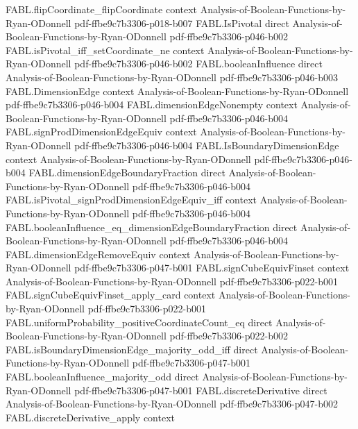 \begin{theorem}
\proofstep
  {FABL.flipCoordinate_flipCoordinate}
  {context}
  {Analysis-of-Boolean-Functions-by-Ryan-ODonnell}
  {pdf-ffbe9c7b3306-p018-b007}
\proofstep
  {FABL.IsPivotal}
  {direct}
  {Analysis-of-Boolean-Functions-by-Ryan-ODonnell}
  {pdf-ffbe9c7b3306-p046-b002}
\proofstep
  {FABL.isPivotal_iff_setCoordinate_ne}
  {context}
  {Analysis-of-Boolean-Functions-by-Ryan-ODonnell}
  {pdf-ffbe9c7b3306-p046-b002}
\proofstep
  {FABL.booleanInfluence}
  {direct}
  {Analysis-of-Boolean-Functions-by-Ryan-ODonnell}
  {pdf-ffbe9c7b3306-p046-b003}
\proofstep
  {FABL.DimensionEdge}
  {context}
  {Analysis-of-Boolean-Functions-by-Ryan-ODonnell}
  {pdf-ffbe9c7b3306-p046-b004}
\proofstep
  {FABL.dimensionEdgeNonempty}
  {context}
  {Analysis-of-Boolean-Functions-by-Ryan-ODonnell}
  {pdf-ffbe9c7b3306-p046-b004}
\proofstep
  {FABL.signProdDimensionEdgeEquiv}
  {context}
  {Analysis-of-Boolean-Functions-by-Ryan-ODonnell}
  {pdf-ffbe9c7b3306-p046-b004}
\proofstep
  {FABL.IsBoundaryDimensionEdge}
  {context}
  {Analysis-of-Boolean-Functions-by-Ryan-ODonnell}
  {pdf-ffbe9c7b3306-p046-b004}
\proofstep
  {FABL.dimensionEdgeBoundaryFraction}
  {direct}
  {Analysis-of-Boolean-Functions-by-Ryan-ODonnell}
  {pdf-ffbe9c7b3306-p046-b004}
\proofstep
  {FABL.isPivotal_signProdDimensionEdgeEquiv_iff}
  {context}
  {Analysis-of-Boolean-Functions-by-Ryan-ODonnell}
  {pdf-ffbe9c7b3306-p046-b004}
\proofstep
  {FABL.booleanInfluence_eq_dimensionEdgeBoundaryFraction}
  {direct}
  {Analysis-of-Boolean-Functions-by-Ryan-ODonnell}
  {pdf-ffbe9c7b3306-p046-b004}
\proofstep
  {FABL.dimensionEdgeRemoveEquiv}
  {context}
  {Analysis-of-Boolean-Functions-by-Ryan-ODonnell}
  {pdf-ffbe9c7b3306-p047-b001}
\proofstep
  {FABL.signCubeEquivFinset}
  {context}
  {Analysis-of-Boolean-Functions-by-Ryan-ODonnell}
  {pdf-ffbe9c7b3306-p022-b001}
\proofstep
  {FABL.signCubeEquivFinset_apply_card}
  {context}
  {Analysis-of-Boolean-Functions-by-Ryan-ODonnell}
  {pdf-ffbe9c7b3306-p022-b001}
\proofstep
  {FABL.uniformProbability_positiveCoordinateCount_eq}
  {direct}
  {Analysis-of-Boolean-Functions-by-Ryan-ODonnell}
  {pdf-ffbe9c7b3306-p022-b002}
\proofstep
  {FABL.isBoundaryDimensionEdge_majority_odd_iff}
  {direct}
  {Analysis-of-Boolean-Functions-by-Ryan-ODonnell}
  {pdf-ffbe9c7b3306-p047-b001}
\proofstep
  {FABL.booleanInfluence_majority_odd}
  {direct}
  {Analysis-of-Boolean-Functions-by-Ryan-ODonnell}
  {pdf-ffbe9c7b3306-p047-b001}
\proofstep
  {FABL.discreteDerivative}
  {direct}
  {Analysis-of-Boolean-Functions-by-Ryan-ODonnell}
  {pdf-ffbe9c7b3306-p047-b002}
\proofstep
  {FABL.discreteDerivative_apply}
  {context}

\end{theorem}

